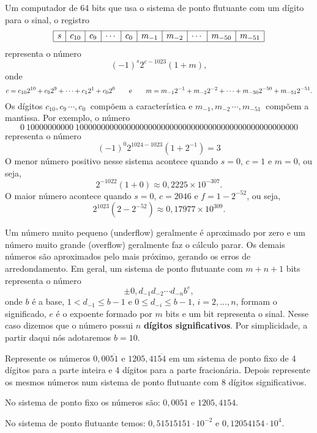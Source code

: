 \begin{ex} Um computador de 64 bits que usa o sistema de ponto flutuante com um dígito para o sinal, o registro
$$
\begin{array}{|c|c|c|c|c|c|c|c|c|c|}
\hline
s&c_{10}&c_{9}&\cdots&c_{0}&m_{-1}&m_{-2}&\cdots &m_{-50}&m_{-51}\\
\hline
\end{array}
$$
representa o número
$$
(-1)^{s}2^{c-1023}(1+m),
$$
onde
$$
c=c_{10}2^{10}+c_92^9+\cdots+c_12^1+c_02^0\qquad\hbox{e}\qquad m=m_{-1}2^{-1}+m_{-2}2^{-2}+\cdots+m_{-50}2^{-50}+m_{-51}2^{-51}.
$$
Os dígitos $c_{10}, c_9\, \cdots, c_0\ $ compõem a característica e $m_{-1}, m_{-2}\, \cdots, m_{-51}\ $ compõem a mantissa. Por exemplo, o número
$$
0\ 1 0 0 0 0 0 0 0 0 0 0 \ 1 0 0 0 0 0 0 0 0 0 0 0 0 0 0 0 0 0 0 0 0 0 0 0 0 0 0 0 0 0 0 0 0 0 0 0 0 0 0 0 0 0 0 0 0 0 0 0 0 0 0 0
$$
representa o número
$$
(-1)^0 2^{1024-1023}(1+2^{-1})=3
$$
O menor número positivo nesse sistema acontece quando $s=0$, $c=1$ e $m=0$, ou seja,
$$
2^{-1022}(1+0)\approx 0,2225\times 10^{-307}.
$$
O maior número acontece quando $s=0$, $c=2046$ e $f=1-2^{-52}$, ou seja,
$$
2^{1023}(2-2^{-52})\approx 0,17977\times 10^{309}.
$$
\end{ex}
Um número muito pequeno (underflow) geralmente é aproximado por zero e um número muito grande (overflow) geralmente faz o cálculo parar. Os demais números são aproximados pelo mais próximo, gerando os erros de arredondamento. Em geral, um sistema de ponto flutuante com $m+n+1$ bits representa o número
$$
\pm 0,d_{-1}d_{-2}\cdots d_{-n} b^e,
$$
onde $b$ é a base, $1<d_{-1}\leq b-1$ e $0\leq d_{-i}\leq b-1$, $i=2,...,n$, formam o significado, $e$ é o expoente formado por $m$ bits e um bit representa o sinal. Nesse caso dizemos que o número possui $n$ {\bf dígitos significativos}. Por simplicidade, a partir daqui nós adotaremos $b=10$.
\begin{ex}Represente os números $0,00\overline{51}$ e $1205,41\overline{54}$ em um sistema de ponto fixo de 4 dígitos para a parte inteira e 4 dígitos para a parte fracionária. Depois represente os mesmos números num sistema de ponto flutuante com 8 dígitos significativos.

No sistema de ponto fixo os números são: $0,0051$ e $1205,4154$.

No sistema de ponto flutuante temos: $0,51515151\cdot 10^{-2}$ e $0,12054154 \cdot 10^{4}$.
\end{ex}


